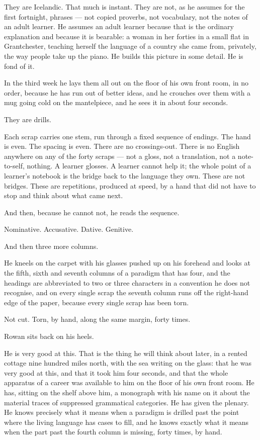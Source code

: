 \documentclass[11pt,oneside]{book}
\begin{document}
They are Icelandic. That much is instant. They are not, as he assumes
for the first fortnight, phrases --- not copied proverbs, not vocabulary,
not the notes of an adult learner. He assumes an adult learner because
that is the ordinary explanation and because it is bearable: a woman in
her forties in a small flat in Grantchester, teaching herself the
language of a country she came from, privately, the way people take up
the piano. He builds this picture in some detail. He is fond of it.

In the third week he lays them all out on the floor of his own front
room, in no order, because he has run out of better ideas, and he
crouches over them with a mug going cold on the mantelpiece, and he sees
it in about four seconds.

They are drills.

Each scrap carries one stem, run through a fixed sequence of endings.
The hand is even. The spacing is even. There are no crossings-out. There
is no English anywhere on any of the forty scraps --- not a gloss, not a
translation, not a note-to-self, nothing. A learner glosses. A learner
cannot help it; the whole point of a learner's notebook is the bridge
back to the language they own. These are not bridges. These are
repetitions, produced at speed, by a hand that did not have to stop and
think about what came next.

And then, because he cannot not, he reads the sequence.

Nominative. Accusative. Dative. Genitive.

And then three more columns.

He kneels on the carpet with his glasses pushed up on his forehead and
looks at the fifth, sixth and seventh columns of a paradigm that has
four, and the headings are abbreviated to two or three characters in a
convention he does not recognise, and on every single scrap the seventh
column runs off the right-hand edge of the paper, because every single
scrap has been torn.

Not cut. Torn, by hand, along the same margin, forty times.

Rowan sits back on his heels.

He is very good at this. That is the thing he will think about later, in
a rented cottage nine hundred miles north, with the sea writing on the
glass: that he was very good at this, and that it took him four seconds,
and that the whole apparatus of a career was available to him on the
floor of his own front room. He has, sitting on the shelf above him,
a monograph with his name on it about the material traces of suppressed
grammatical categories. He has given the plenary. He knows precisely
what it means when a paradigm is drilled past the point where the living
language has cases to fill, and he knows exactly what it means when the
part past the fourth column is missing, forty times, by hand.
\end{document}
